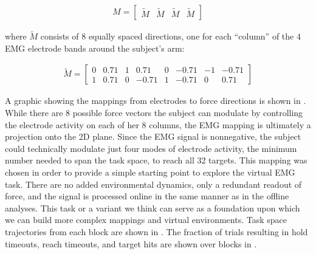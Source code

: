 \documentclass[../main.tex]{subfiles}
\begin{document}
\begin{align}
M = \begin{bmatrix}\tilde{M} & \tilde{M} & \tilde{M} & \tilde{M}\end{bmatrix}
\end{align}

where $\tilde{M}$ consists of 8 equally spaced directions, one for
each ``column'' of the 4 EMG electrode bands around the subject's arm:

\begin{align}
\tilde{M} =
\begin{bmatrix}
0  & 0.71  & 1   & 0.71   & 0  & -0.71  & -1  & -0.71 \\
1  & 0.71  & 0  & -0.71  & 1   & -0.71   & 0   & 0.71
\end{bmatrix}
\end{align}

A graphic showing the mappings from electrodes to force directions is shown in . While there are 8 possible force vectors the subject can modulate by controlling the electrode activity on each of her 8 columns, the EMG mapping is ultimately a projection onto the 2D plane. Since the EMG signal is nonnegative, the subject could technically modulate just four modes of electrode activity, the minimum number needed to span the task space, to reach all 32 targets. This mapping was chosen in order to provide a simple starting point to explore the virtual EMG task. There are no added environmental dynamics, only a redundant readout of force, and the signal is processed online in the same manner as in the offline analyses. This task or a variant we think can serve as a foundation upon which we can build more complex mappings and virtual environments. Task space trajectories from each block are shown in . The fraction of trials resulting in hold timeouts, reach timeouts, and target hits are shown over blocks in .

\end{document}
